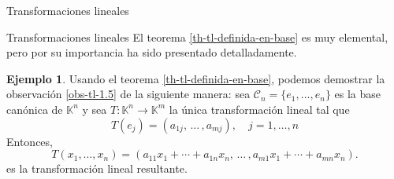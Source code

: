 \documentclass[a4paper,12pt,twoside,spanish]{amsbook}
\theoremstyle{definition}
\newtheorem{ejemplo}{Ejemplo}[section]
\theoremstyle{remark}
\newcommand{\K}{\mathbb K}
\begin{document}
\begin{chapter}{Transformaciones lineales}
\begin{section}{Transformaciones lineales}
		El teorema \ref{th-tl-definida-en-base} es muy elemental, pero por su importancia ha sido presentado
		detalladamente. 
		
			\begin{ejemplo} Usando el teorema \ref{th-tl-definida-en-base}, podemos demostrar la observación \ref{obs-tl-1.5} de la siguiente manera: sea  $\mathcal C_n = \{e_1,\ldots,e_n\}$ es la base canónica de $\K^n$ y  sea  $T: \K^n \to \K^m$ la única transformación lineal tal que 
			\begin{equation*}
			T(e_j)  = (a_{1j},\, \ldots\,,a_{mj} ), \quad j=1,\ldots,n
			\end{equation*}	
			Entonces, 
			\begin{equation*}
			T(x_1,\ldots,x_n) = (a_{11}x_1+\cdots + a_{1n}x_n,\, \ldots\,,a_{m1}x_1+\cdots + a_{mn}x_n ).
			\end{equation*}
			es la transformación lineal resultante.
		\end{ejemplo}
		

\end{section}
\end{chapter}
\end{document}
